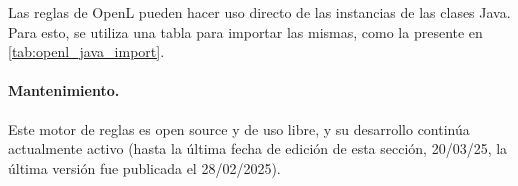Las reglas de OpenL pueden hacer uso directo de las instancias de las clases Java. Para esto, se utiliza una tabla para importar las mismas, como la presente en \cref{tab:openl_java_import}.

\paragraph{Mantenimiento.}
Este motor de reglas es open source y de uso libre, y su desarrollo continúa actualmente activo (hasta la última fecha de edición de esta sección, 20/03/25, la última versión fue publicada el 28/02/2025).

